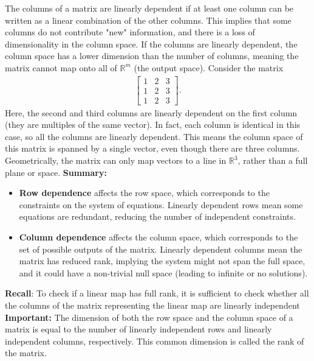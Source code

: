 \documentclass{report}
\begin{document}
\begin{itemize}
        \bigbreak \noindent 
        The columns of a matrix are linearly dependent if at least one column can be written as a linear combination of the other columns.
        \bigbreak \noindent 
        This implies that some columns do not contribute "new" information, and there is a loss of dimensionality in the column space.
        \bigbreak \noindent 
        If the columns are linearly dependent, the column space has a lower dimension than the number of columns, meaning the matrix cannot map onto all of $\mathbb{R}^{m}$ (the output space).
        \bigbreak \noindent 
        Consider the matrix
        \begin{align*}
            \begin{bmatrix} 1 & 2 & 3 \\ 1 & 2 & 3 \\ 1 & 2 & 3\end{bmatrix}
        .\end{align*}
        \bigbreak \noindent 
        Here, the second and third columns are linearly dependent on the first column (they are multiples of the same vector). In fact, each column is identical in this case, so all the columns are linearly dependent.
        \bigbreak \noindent 
        This means the column space of this matrix is spanned by a single vector, even though there are three columns.
        \bigbreak \noindent 
        Geometrically, the matrix can only map vectors to a line in $\mathbb{R}^{3}$, rather than a full plane or space.
        \bigbreak \noindent 
        \textbf{Summary:}
        \begin{itemize}
            \item \textbf{Row dependence} affects the row space, which corresponds to the constraints on the system of equations. Linearly dependent rows mean some equations are redundant, reducing the number of independent constraints.
            \item \textbf{Column dependence} affects the column space, which corresponds to the set of possible outputs of the matrix. Linearly dependent columns mean the matrix has reduced rank, implying the system might not span the full space, and it could have a non-trivial null space (leading to infinite or no solutions).
        \end{itemize}
        \bigbreak \noindent 
        \textbf{Recall}: To check if a linear map has full rank, it is sufficient to check whether all the columns of the matrix representing the linear map are linearly independent
        \bigbreak \noindent 
        \textbf{Important:} The dimension of both the row space and the column space of a matrix is equal to the number of linearly independent rows and linearly independent columns, respectively. This common dimension is called the rank of the matrix.

\end{itemize}
\end{document}
